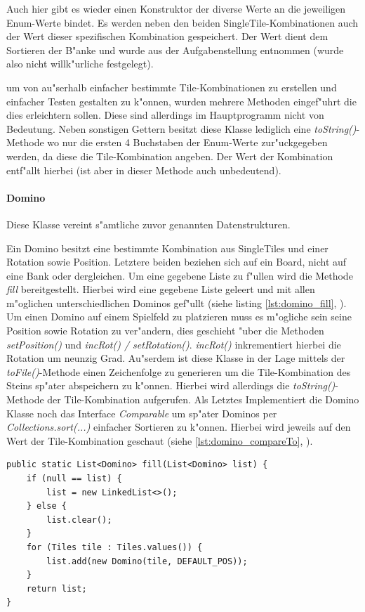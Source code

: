 Auch hier gibt es wieder einen Konstruktor der diverse Werte an die jeweiligen Enum-Werte bindet. Es werden neben den beiden SingleTile-Kombinationen auch der Wert dieser spezifischen Kombination gespeichert. Der Wert dient dem Sortieren der B"anke und wurde aus der Aufgabenstellung entnommen (wurde also nicht willk"urliche festgelegt). 

um von au"serhalb einfacher bestimmte Tile-Kombinationen zu erstellen und einfacher Testen gestalten zu k"onnen, wurden mehrere Methoden eingef"uhrt die dies erleichtern sollen. Diese sind allerdings im Hauptprogramm nicht von Bedeutung. Neben sonstigen Gettern besitzt diese Klasse lediglich eine \emph{toString()}-Methode wo nur die ersten 4 Buchstaben der Enum-Werte zur"uckgegeben werden, da diese die Tile-Kombination angeben. Der Wert der Kombination entf"allt hierbei (ist aber in dieser Methode auch unbedeutend).


\paragraph{Domino}
\label{par:domino}
Diese Klasse vereint s"amtliche zuvor genannten Datenstrukturen. 

Ein Domino besitzt eine bestimmte Kombination aus SingleTiles und einer Rotation sowie Position. Letztere beiden beziehen sich auf ein Board, nicht auf eine Bank oder dergleichen. Um eine gegebene Liste zu f"ullen wird die Methode \emph{fill} bereitgestellt. Hierbei wird eine gegebene Liste geleert und mit allen m"oglichen unterschiedlichen Dominos gef"ullt (siehe listing \ref{lst:domino_fill}, ). Um einen Domino auf einem Spielfeld zu platzieren muss es m"ogliche sein seine Position sowie Rotation zu ver"andern, dies geschieht "uber die Methoden \emph{setPosition()} und \emph{incRot() / setRotation()}. \emph{incRot()} inkrementiert hierbei die Rotation um neunzig Grad. Au"serdem ist diese Klasse in der Lage mittels der \emph{toFile()}-Methode einen Zeichenfolge zu generieren um die Tile-Kombination des Steins sp"ater abspeichern zu k"onnen. Hierbei wird allerdings die \emph{toString()}-Methode der Tile-Kombination aufgerufen. Als Letztes Implementiert die Domino Klasse noch das Interface \emph{Comparable} um sp"ater Dominos per \emph{Collections.sort(...)} einfacher Sortieren zu k"onnen. Hierbei wird jeweils auf den Wert der Tile-Kombination geschaut (siehe \ref{lst:domino_compareTo}, ). 

\begin{lstlisting}[float,style=CodeHighlighting,caption=Domino - fill,label=lst:domino_fill]
public static List<Domino> fill(List<Domino> list) {
    if (null == list) {
        list = new LinkedList<>();
    } else {
        list.clear();
    }
    for (Tiles tile : Tiles.values()) {
        list.add(new Domino(tile, DEFAULT_POS));
    }
    return list;
}
\end{lstlisting}

